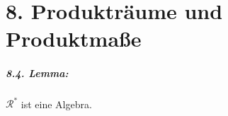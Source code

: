 \documentclass[11pt]{report}
\begin{document}
\newcommand{\E}{\mathbb{E}}
\newcommand{\cR}{\mathcal{R}}
\newcommand{\cB}{\mathcal{B}}
\newcommand{\C}{\mathbb{C}}
\newcommand{\del}{\partial}
\newcommand{\A}{\mathcal{A}}
\newcommand{\G}{\mathcal{G}}
\renewcommand{\geq}{\geqslant}
\renewcommand{\leq}{\leqslant}
\newcommand{\eps}{\varepsilon}
\newcommand{\Pp}{\mathbb{P}}
\newcommand{\R}{\mathbb{R}}
\newcommand{\Var}{\operatorname{Var}}
\newcommand{\pspace}{(\Omega, \mathcal{A}, \Pp)}
\newcommand{\borel}{\mathcal{B}(\R)}
\newcommand{\ind}[1]{\mathds{1}_{#1}}
\newcommand{\nto}[2]{\xrightarrow[#2]{\makebox[1.5em][c]{$\scriptstyle#1$}}}‌

\chapter*{8. Produktr\"aume und Produktma\ss{}e}
\paragraph{8.4. Lemma:}$\cR^*$ ist eine Algebra.
\end{document}
